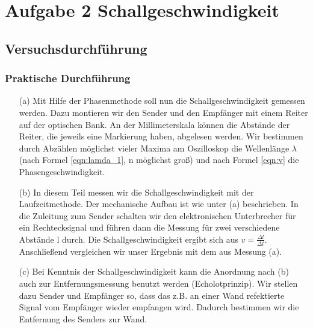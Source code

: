 \documentclass[12pt]{scrartcl}
\begin{document}
\section{Aufgabe 2 Schallgeschwindigkeit}
\subsection{Versuchsdurchführung}
\subsubsection{Praktische Durchführung}
\begin{itemize}
\item[(a)]
Mit Hilfe der Phasenmethode soll nun die Schallgeschwindigkeit gemessen werden. Dazu montieren wir den Sender und den Empfänger mit einem Reiter auf der optischen Bank. An der Millimeterskala können die Abstände der Reiter, die jeweils eine Markierung haben, abgelesen werden. Wir bestimmen durch Abzählen möglichst vieler Maxima am Oszilloskop die Wellenlänge $\lambda$ (nach Formel \ref{eqn:lamda_1}, n möglichst groß) und nach Formel \ref{eqn:v} die Phasengeschwindigkeit.
\item[(b)]
In diesem Teil messen wir die Schallgeschwindigkeit mit der Laufzeitmethode. Der mechanische Aufbau ist wie unter (a) beschrieben. In die Zuleitung zum Sender schalten wir den elektronischen Unterbrecher für ein Rechtecksignal und führen dann die Messung für zwei verschiedene Abstände l durch. Die Schallgeschwindigkeit ergibt sich aus $v = \frac{\Delta l}{\Delta t}$. Anschließend vergleichen wir unser Ergebnis mit dem aus Messung (a).
\item[(c)]
Bei Kenntnis der Schallgeschwindigkeit kann die Anordnung nach (b) auch zur Entfernungsmessung benutzt werden (Echolotprinzip). Wir stellen dazu Sender und Empfänger so, dass das z.B. an einer Wand refektierte Signal vom Empfänger wieder empfangen wird. Dadurch bestimmen wir die Entfernung des Senders zur Wand.
\end{itemize}
\end{document}
